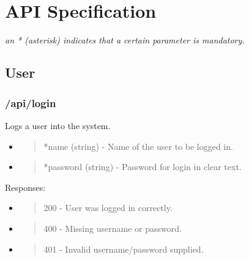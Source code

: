\hypertarget{section-18}{%
\section{\texorpdfstring{\\
}{ }}\label{section-18}}

\hypertarget{api-specification}{%
\section{API Specification}\label{api-specification}}

\emph{an * (asterisk) indicates that a certain parameter is mandatory.}

\hypertarget{user}{%
\subsection{User}\label{user}}

\hypertarget{apilogin}{%
\subsubsection{/api/login}\label{apilogin}}

Logs a user into the system.

\begin{itemize}
\item
  \begin{quote}
  *name (string) - Name of the user to be logged in.
  \end{quote}
\item
  \begin{quote}
  *password (string) - Password for login in clear text.
  \end{quote}
\end{itemize}

Responses:

\begin{itemize}
\item
  \begin{quote}
  200 - User was logged in correctly.
  \end{quote}
\item
  \begin{quote}
  400 - Missing username or password.
  \end{quote}
\item
  \begin{quote}
  401 - Invalid username/password supplied.
  \end{quote}
\end{itemize}

